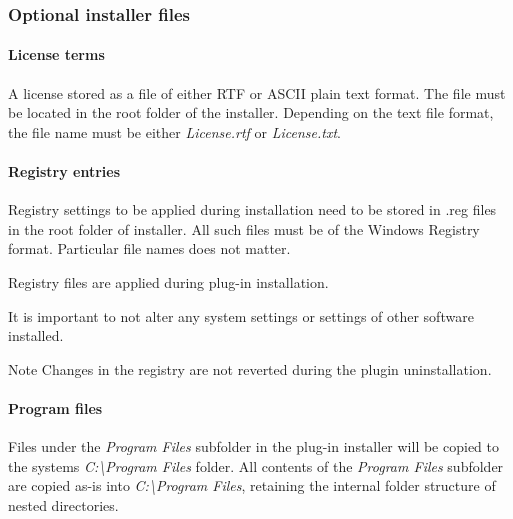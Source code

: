 \hypertarget{a00849_subsection__aax_venue_guide__installer__optional_files}{}\subsubsection{Optional installer files}\label{a00849_subsection__aax_venue_guide__installer__optional_files}
\hypertarget{a00849_subsubsection__aax_venue_guide__installer__optional_files__license}{}\paragraph{License terms}\label{a00849_subsubsection__aax_venue_guide__installer__optional_files__license}
 A license stored as a file of either R\+TF or A\+S\+C\+II plain text format. The file must be located in the root folder of the installer. Depending on the text file format, the file name must be either {\itshape License.\+rtf} or {\itshape License.\+txt}.

\hypertarget{a00849_subsubsection__aax_venue_guide__installer__optional_files__registry}{}\paragraph{Registry entries}\label{a00849_subsubsection__aax_venue_guide__installer__optional_files__registry}
 Registry settings to be applied during installation need to be stored in .reg files in the root folder of installer. All such files must be of the Windows Registry format. Particular file names does not matter.

 Registry files are applied during plug-\/in installation.

 It is important to not alter any system settings or settings of other software installed.

 \begin{DoxyNote}{Note}
Changes in the registry are not reverted during the plugin uninstallation.
\end{DoxyNote}
\hypertarget{a00849_subsubsection__aax_venue_guide__installer__optional_files__program}{}\paragraph{Program files}\label{a00849_subsubsection__aax_venue_guide__installer__optional_files__program}
 Files under the {\itshape Program Files} subfolder in the plug-\/in installer will be copied to the system\textquotesingle{}s {\itshape C\+:\textbackslash{}Program Files} folder. All contents of the {\itshape Program Files} subfolder are copied as-\/is into {\itshape C\+:\textbackslash{}Program Files}, retaining the internal folder structure of nested directories.

